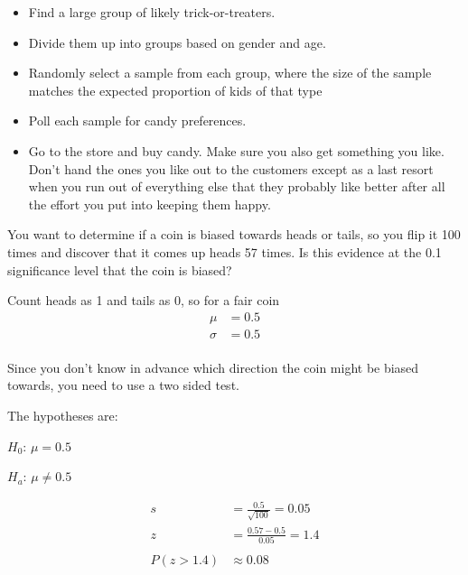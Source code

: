 \documentclass[landscape]{exam}
\begin{document}
\begin{questions}
\begin{solution}
        \begin{itemize}
          \item Find a large group of likely trick-or-treaters.

          \item Divide them up into groups based on gender and age.

          \item Randomly select a sample from each group, where the size of the
            sample matches the expected proportion of kids of that type

          \item Poll each sample for candy preferences.

          \item Go to the store and buy candy. Make sure you also get something
            you like. Don't hand the ones you like out to the customers
            except as a last resort when you run out of everything else that
            they probably like better after all the effort you put into keeping
            them happy. 

        \end{itemize}

      \end{solution}

    \question[12]
      You want to determine if a coin is biased towards heads or tails, so you
      flip it 100 times and discover that it comes up heads 57 times. Is this
      evidence at the 0.1 significance level that the coin is biased?

     Count heads as 1 and tails as 0, so for a fair coin
     \begin{align*}
       \mu    & = 0.5 \\
       \sigma & = 0.5 \\
     \end{align*}

      \begin{solution}
        Since you don't know in advance which direction the coin might be
        biased towards, you need to use a two sided test.

        The hypotheses are:
        \begin{itemize*}
          \item $H_0$: $\mu = 0.5$
          \item $H_a$: $\mu \ne 0.5$
        \end{itemize*}

        \begin{align*}
          s & = \frac{0.5}{\sqrt{100}} = 0.05 \\
          z & = \frac{0.57 - 0.5}{0.05} = 1.4 \\
          \\
          P(z > 1.4) & \approx 0.08 \\
        \end{align*}


\end{solution}
\end{questions}
\end{document}
